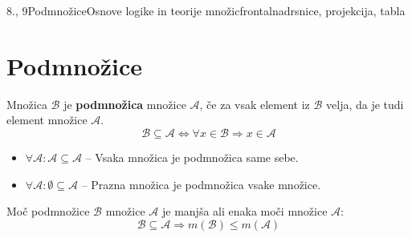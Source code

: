 \begin{priprava}{8., 9}{}{Podmnožice}{Osnove logike in teorije množic}{frontalna}{drsnice, projekcija, tabla}


    \section{Podmnožice}
        
    Množica $\mathcal{B}$ je \textbf{podmnožica} množice $\mathcal{A}$, če za vsak element iz
    $\mathcal{B}$ velja, da je tudi element množice $\mathcal{A}$.
    $$ \mathcal{B}\subseteq\mathcal{A}\Leftrightarrow\forall x\in\mathcal{B}\Rightarrow x\in\mathcal{A} $$
            

    \begin{figure}[H]   
        \centering         
    \end{figure}


      

        \begin{itemize}
            \item $\forall \mathcal{A}:\mathcal{A}\subseteq\mathcal{A}$ -- Vsaka množica je podmnožica
                same sebe.
            \item $\forall \mathcal{A}:\emptyset\subseteq\mathcal{A}$ -- Prazna množica je podmnožica
                vsake množice. \newline
        \end{itemize}
        

        Moč podmnožice $\mathcal{B}$ množice $\mathcal{A}$ je manjša ali enaka moči množice $\mathcal{A}$:
        $$\mathcal{B}\subseteq\mathcal{A}\Rightarrow m(\mathcal{B})\leq m(\mathcal{A})$$





\end{priprava}
